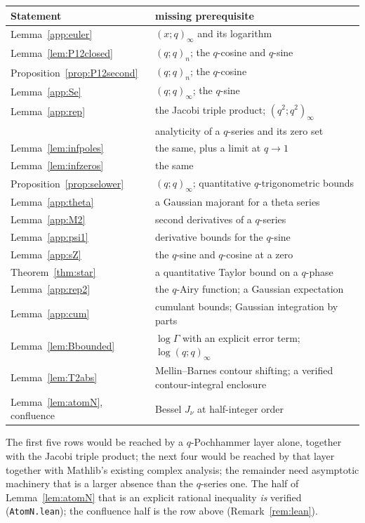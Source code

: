 \documentclass[11pt]{article}
\theoremstyle{plain}
\theoremstyle{definition}
\theoremstyle{remark}
\begin{document}
\begin{center}\small
\begin{tabular}{ll}
\hline
Statement & missing prerequisite \\
\hline
Lemma~\ref{app:euler} & $(x;q)_\infty$ and its logarithm \\
Lemma~\ref{lem:P12closed} & $(q;q)_n$; the $q$-cosine and $q$-sine \\
Proposition~\ref{prop:P12second} & $(q;q)_n$; the $q$-cosine \\
Lemma~\ref{app:Se} & $(q;q)_\infty$; the $q$-sine \\
Lemma~\ref{app:rep} & the Jacobi triple product; $(q^2;q^2)_\infty$ \\
{\cite[Lemma ``The travel poles are locally finite'', \textup{lem:polefinite}]{Bonfioli2026bA}} & analyticity of a $q$-series and its zero set \\
Lemma~\ref{lem:infpoles} & the same, plus a limit at $q\to1$ \\
Lemma~\ref{lem:infzeros} & the same \\
Proposition~\ref{prop:selower} & $(q;q)_\infty$; quantitative $q$-trigonometric bounds \\
Lemma~\ref{app:theta} & a Gaussian majorant for a theta series \\
Lemma~\ref{app:M2} & second derivatives of a $q$-series \\
Lemma~\ref{app:psi1} & derivative bounds for the $q$-sine \\
Lemma~\ref{app:sZ} & the $q$-sine and $q$-cosine at a zero \\
Theorem~\ref{thm:star} & a quantitative Taylor bound on a $q$-phase \\
Lemma~\ref{app:rep2} & the $q$-Airy function; a Gaussian expectation \\
Lemma~\ref{app:cum} & cumulant bounds; Gaussian integration by parts \\
Lemma~\ref{lem:Bbounded} & $\log\Gamma$ with an explicit error term; $\log(q;q)_\infty$ \\
Lemma~\ref{lem:T2abs} & Mellin--Barnes contour shifting; a verified contour-integral enclosure \\
Lemma~\ref{lem:atomN}, confluence & Bessel $J_\nu$ at half-integer order \\
\hline
\end{tabular}
\end{center}

\noindent The first five rows would be reached by a $q$-Pochhammer layer alone, together with the
Jacobi triple product; the next four would be reached by that layer together with Mathlib's
existing complex analysis; the remainder need asymptotic machinery that is a larger absence than
the $q$-series one. The half of Lemma~\ref{lem:atomN} that is an explicit rational inequality
\emph{is} verified (\texttt{AtomN.lean}); the confluence half is the row above
(Remark~\ref{rem:lean}).
\end{document}
